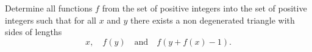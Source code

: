 Determine all functions $f$ from the set of positive integers into the set of positive integers such that for all $x$ and $y$ there exists a non degenerated triangle with sides of lengths
\[
x, \quad f(y) \quad \text{and} \quad f(y + f(x) - 1).
\]
